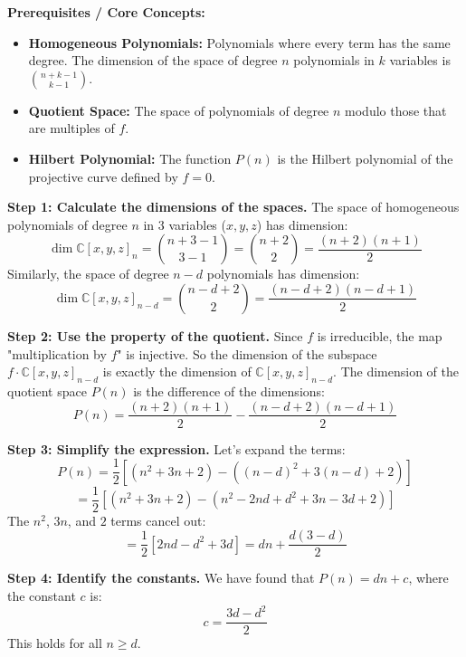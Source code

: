 \begin{solution}
\textbf{Prerequisites / Core Concepts:}
\begin{itemize}
    \item \textbf{Homogeneous Polynomials:} Polynomials where every term has the same degree. The dimension of the space of degree $n$ polynomials in $k$ variables is $\binom{n+k-1}{k-1}$.
    \item \textbf{Quotient Space:} The space of polynomials of degree $n$ modulo those that are multiples of $f$.
    \item \textbf{Hilbert Polynomial:} The function $P(n)$ is the Hilbert polynomial of the projective curve defined by $f=0$.
\end{itemize}

\textbf{Step 1: Calculate the dimensions of the spaces.}
The space of homogeneous polynomials of degree $n$ in 3 variables ($x, y, z$) has dimension:
\[ \dim \mathbb{C}[x, y, z]_n = \binom{n+3-1}{3-1} = \binom{n+2}{2} = \frac{(n+2)(n+1)}{2} \]
Similarly, the space of degree $n-d$ polynomials has dimension:
\[ \dim \mathbb{C}[x, y, z]_{n-d} = \binom{n-d+2}{2} = \frac{(n-d+2)(n-d+1)}{2} \]

\textbf{Step 2: Use the property of the quotient.}
Since $f$ is irreducible, the map "multiplication by $f$" is injective. So the dimension of the subspace $f \cdot \mathbb{C}[x, y, z]_{n-d}$ is exactly the dimension of $\mathbb{C}[x, y, z]_{n-d}$.
The dimension of the quotient space $P(n)$ is the difference of the dimensions:
\[ P(n) = \frac{(n+2)(n+1)}{2} - \frac{(n-d+2)(n-d+1)}{2} \]

\textbf{Step 3: Simplify the expression.}
Let's expand the terms:
\[ P(n) = \frac{1}{2} [ (n^2 + 3n + 2) - ((n-d)^2 + 3(n-d) + 2) ] \]
\[ = \frac{1}{2} [ (n^2 + 3n + 2) - (n^2 - 2nd + d^2 + 3n - 3d + 2) ] \]
The $n^2$, $3n$, and $2$ terms cancel out:
\[ = \frac{1}{2} [ 2nd - d^2 + 3d ] = dn + \frac{d(3-d)}{2} \]

\textbf{Step 4: Identify the constants.}
We have found that $P(n) = dn + c$, where the constant $c$ is:
\[ c = \frac{3d - d^2}{2} \]
This holds for all $n \geq d$.
\end{solution}

